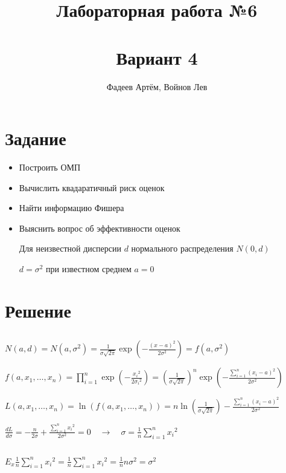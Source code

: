 \documentclass[12pt, a4paper]{article}
\title{Лабораторная работа №6 \\ \ \\\large Вариант 4 \\}
\author{Фадеев Артём, Войнов Лев}
\begin{document}
\maketitle

\section{Задание}
\begin{itemize}
    \item Построить ОМП
    \item Вычислить квадаратичный риск оценок
    \item Найти информацию Фишера
    \item Выяснить вопрос об эффективности оценок
    
    Для неизвестной дисперсии $d$ нормального распределения $N(0, d)$
    
    $d = \sigma^2$ при известном среднем $a = 0$

\end{itemize}

\newpage
\section{Решение}

\subsection{}

$N(a, d) = N(a, \sigma^2) =
\frac{1}{\sigma \sqrt{2 \pi}} \exp(-\frac{(x - a)^2}{2\sigma^2}) = f(a, \sigma^2)$

$f(a, x_1, \dots, x_n) =
\prod\limits_{i = 1}^n \exp(-\frac{{x_i}^2}{2{\sigma_i}^2}) =
(\frac{1}{\sigma \sqrt{2\pi}})^n \exp(-\frac{\sum\limits_{i = 1}^n (x_i - a)^2}{2\sigma^2})$

$L(a, x_1, \dots, x_n) = \ln(f(a, x_1, \dots, x_n)) = 
n \ln(\frac{1}{\sigma \sqrt{2\pi}}) - \frac{\sum\limits_{i = 1}^n (x_i - a)^2}{2\sigma^2}$

$\frac{dL}{d\sigma} = -\frac{n}{2\sigma} + \frac{\sum\limits_{i = 1}^n {x_i}^2}{2\sigma^2} = 0 \quad \rightarrow  \quad \sigma = \frac{1}{n} \sum\limits_{i = 1}^n {x_i}^2$


\subsection{}

$E_x \frac{1}{n} \sum\limits_{i = 1}^n {x_i}^2 = 
\frac{1}{n} \sum\limits_{i = 1}^n {x_i}^2 = 
\frac{1}{n} n \sigma^2 = \sigma^2$
\end{document}
